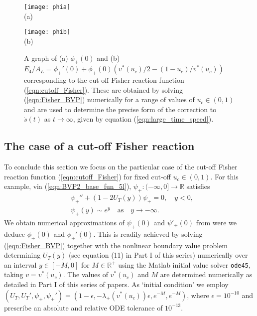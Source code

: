 \documentclass[11pt,a4paper]{article}
\newcommand{\eeref}[1]{(\ref{eqn:#1})}
\newcommand{\eelab}[1]{\label{eqn:#1}}
\newcommand{\fflab}[1]{\label{fig:#1}}
\begin{document}
 
 

 \begin{figure} [t] 
 		     \centering
 		     \begin{minipage}{0.485\textwidth}
 		  	     \texttt{[image: phia]}\\
 		  	      \centering  (a) 
 		     \end{minipage}
 		     \hfill
 		     \begin{minipage}{0.485\textwidth}
 		  	   \texttt{[image: phib]}\\
 		    \centering  (b)  
			   \end{minipage}
 \caption{A graph of  (a) $\phi_+(0)$ and (b) $E_4/A_L=\phi_+'(0)+\phi_+(0)(v^*(u_c)/2-(1-u_c)/v^*(u_c))$ 
corresponding to the 
 cut-off Fisher reaction function \eeref{cutoff_Fisher}. These are obtained 
  by solving \eeref{Fisher_BVP} numerically   for a range of values of $u_c\in(0,1)$
and are used to determine the precise form of the correction to $\dot s(t)$ as $t\to\infty$, given by equation \eeref{large_time_speed}.  
 }
 \fflab{phi}
 \end{figure} 
 
 \subsection{The  case of a cut-off Fisher reaction}

To conclude this section we focus on the particular case of the cut-off Fisher reaction function \eeref{cutoff_Fisher} for fixed cut-off  $u_c \in (0,1)$.
For this example, via \eeref{BVP2_base_fun_5l}, 
  $\psi_+ : (-\infty, 0] \to \mathbb{R}$ satisfies 
\begin{subequations} \eelab{Fisher_BVP}
 \begin{align}
& \psi_+'' + \left(1 - 2 U_T(y) \right) \psi_+ = 0, \quad y < 0 , \eelab{numerics_BVP_base_fun_1}  \\
& \psi_+(y) \sim e^y \quad \mbox{as} \quad y \to - \infty. \eelab{numerics_BVP_base_fun_2} 
\end{align}
\end{subequations}
We obtain  numerical approximations of $\psi_+(0)$ and $\psi'_+(0)$ from were we deduce 
$\phi_+(0)$ and $\phi_+'(0)$.
This is readily achieved by
solving \eeref{Fisher_BVP} 
together with the nonlinear boundary value 
problem determining $U_T(y)$ (see equation (11) in Part I of this series)
numerically over an interval $y\in[-M,0]$  for $M \in\mathbb{R}^+$   using the Matlab initial value solver \texttt{ode45}, taking $v=v^*(u_c)$.
The  values of $v^*(u_c)$  and $M$ are  determined numerically as detailed in Part I of this series of papers.  
%
 As `initial condition'
we employ 
$(U_T,U_T',\psi_+,\psi_+')=(1-\epsilon, -\lambda_+(v^*(u_c))\epsilon, e^{-M},e^{-M})$, 
where $\epsilon=10^{-10}$ %
and prescribe an absolute and relative ODE tolerance  of $10^{-13}$.
 
\end{document}
